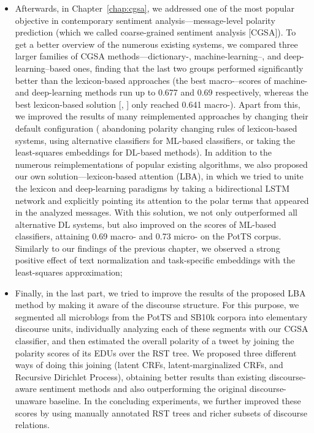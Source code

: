 \begin{itemize}
\item Afterwards, in Chapter~\ref{chap:cgsa}, we addressed one of the
  most popular objective in contemporary sentiment
  analysis---message-level polarity prediction (which we called
  coarse-grained sentiment analysis [CGSA]).  To get a better overview
  of the numerous existing systems, we compared three larger families
  of CGSA methods---dictionary-, machine-learning--, and
  deep-learning--based ones, finding that the last two groups
  performed significantly better than the lexicon-based approaches
  (the best macro-\F{}--scores of machine- and deep-learning methods
  run up to 0.677 and 0.69 respectively, whereas the best
  lexicon-based solution [\citeauthor{Hu:04}, \citeyear{Hu:04}] only
  reached 0.641 macro-\F{}).  Apart from this, we improved the results
  of many reimplemented approaches by changing their default
  configuration (\eg{} abandoning polarity changing rules of
  lexicon-based systems, using alternative classifiers for ML-based
  classifiers, or taking the least-squares embeddings for DL-based
  methods).  In addition to the numerous reimplementations of popular
  existing algorithms, we also proposed our own
  solution---lexicon-based attention (LBA), in which we tried to unite
  the lexicon and deep-learning paradigms by taking a bidirectional
  LSTM network and explicitly pointing its attention to the polar
  terms that appeared in the analyzed messages.  With this solution,
  we not only outperformed all alternative DL systems, but also
  improved on the scores of ML-based classifiers, attaining 0.69
  macro-\F{} and 0.73 micro-\F{} on the PotTS corpus.  Similarly to
  our findings of the previous chapter, we observed a strong positive
  effect of text normalization and task-specific embeddings with the
  least-squares approximation;

\item Finally, in the last part, we tried to improve the results of
  the proposed LBA method by making it aware of the discourse
  structure.  For this purpose, we segmented all microblogs from the
  PotTS and SB10k corpora into elementary discourse units,
  individually analyzing each of these segments with our CGSA
  classifier, and then estimated the overall polarity of a tweet by
  joining the polarity scores of its EDUs over the RST tree.  We
  proposed three different ways of doing this joining (latent CRFs,
  latent-marginalized CRFs, and Recursive Dirichlet Process),
  obtaining better results than existing discourse-aware sentiment
  methods and also outperforming the original discourse-unaware
  baseline.  In the concluding experiments, we further improved these
  scores by using manually annotated RST trees and richer subsets of
  discourse relations.
\end{itemize}


